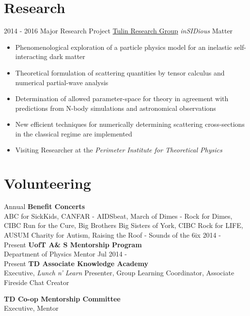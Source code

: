 \documentclass[letterpaper]{twentysecondcv} %
\begin{document}
\vfill

\section{Research}
\begin{twenty}
	\twentyitem
    	{2014 - 2016}
        {Major Research Project}
        {\href{http://www.yorku.ca/stulin/research.html}{Tulin Research Group}}
        {\emph{inSIDious} Matter}
        {%
        \item{}
        \item{}
        }
        {\begin{itemize}
        \item Phenomenological exploration of a particle physics model for an inelastic self-interacting dark matter
        \item Theoretical formulation of scattering quantities by tensor calculus and numerical partial-wave analysis
        \item Determination of allowed parameter-space for theory in agreement with predictions from N-body simulations and astronomical observations
       	\item New efficient techniques for numerically determining scattering cross-sections in the classical regime are implemented
    	\item Visiting Researcher at the \emph{Perimeter Institute for Theoretical Physics}
		\end{itemize}}
\end{twenty}

\vfill

\section{Volunteering}
\begin{twentyshort}
\twentyitemshort
		{Annual}
		{\textbf{Benefit Concerts} \\ ABC for SickKids, CANFAR - AIDSbeat, March of Dimes - Rock for Dimes, CIBC Run for the Cure, Big Brothers Big Sisters of York, CIBC Rock for LIFE, AUSUM Charity for Autism, Raising the Roof - Sounds of the 6ix}
\twentyitemshort
   		{2014 - \\ Present}
        {\textbf{UofT A\& S Mentorship Program} \\ Department of Physics Mentor}
\twentyitemshort
   		{Jul 2014 - \\ Present}
        {\textbf{TD Associate Knowledge Academy} \\ Executive, \emph{Lunch n' Learn} Presenter, Group Learning Coordinator, Associate Fireside Chat Creator}

\twentyitemshort
   		{}
        {\textbf{TD Co-op Mentorship Committee} \\ Executive, Mentor}
\end{twentyshort}
\end{document}
